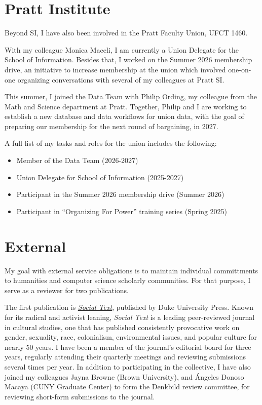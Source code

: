\documentclass[12pt]{article}
\begin{document}
\section*{Pratt Institute}
\label{sec:org58a18f7}
Beyond SI, I have also been involved in the Pratt Faculty Union,
UFCT 1460.

With my colleague Monica Maceli, I am currently a Union Delegate for
the School of Information. Besides that, I worked on the Summer 2026
membership drive, an initiative to increase membership at the union
which involved one-on-one organizing conversations with several of my
colleagues at Pratt SI.

This summer, I joined the Data Team with Philip Ording, my colleague
from the Math and Science department at Pratt. Together, Philip and I
are working to establish a new database and data workflows for union
data, with the goal of preparing our membership for the next round of
bargaining, in 2027.

A full list of my tasks and roles for the union includes the
following:
\begin{itemize}
\item Member of the Data Team (2026-2027)
\item Union Delegate for School of Information (2025-2027)
\item Participant in the Summer 2026 membership drive (Summer 2026)
\item Participant in ``Organizing For Power'' training series
(Spring 2025)
\end{itemize}

\section*{External}
\label{sec:org7181e17}
My goal with external service obligations is to maintain individual
committments to humanities and computer science scholarly communities.
For that purpose, I serve as a reviewer for two publications.

The first publication is \emph{\href{https://read.dukeupress.edu/social-text}{\uline{Social Text}}}, published by Duke University
Press. Known for its radical and activist leaning, \emph{Social Text} is a
leading peer-reviewed journal in cultural studies, one that has
published consistently provocative work on gender, sexuality, race,
colonialism, environmental issues, and popular culture for nearly 50
years. I have been a member of the journal's editorial board for three
years, regularly attending their quarterly meetings and reviewing
submissions several times per year. In addition to participating in
the collective, I have also joined my colleagues Jayna Browne (Brown
University), and Ángeles Donoso Macaya (CUNY Graduate Center) to form
the Denkbild review committee, for reviewing short-form submissions to
the journal.
\end{document}
